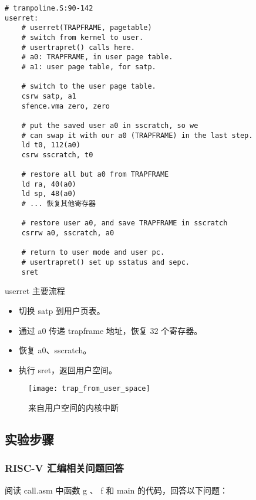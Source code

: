 \begin{listing}[!htb]
	\begin{verbatim}
# trampoline.S:90-142
userret:
    # userret(TRAPFRAME, pagetable)
    # switch from kernel to user.
    # usertrapret() calls here.
    # a0: TRAPFRAME, in user page table.
    # a1: user page table, for satp.

    # switch to the user page table.
    csrw satp, a1
    sfence.vma zero, zero

    # put the saved user a0 in sscratch, so we
    # can swap it with our a0 (TRAPFRAME) in the last step.
    ld t0, 112(a0)
    csrw sscratch, t0

    # restore all but a0 from TRAPFRAME
    ld ra, 40(a0)
    ld sp, 48(a0)
    # ... 恢复其他寄存器

    # restore user a0, and save TRAPFRAME in sscratch
    csrrw a0, sscratch, a0

    # return to user mode and user pc.
    # usertrapret() set up sstatus and sepc.
    sret
	\end{verbatim}
	\caption{userret 主要流程}\label{lst:userret}
\end{listing}

\begin{itemize}
	\item 切换 satp 到用户页表。
	\item 通过 a0 传递 trapframe 地址，恢复 32 个寄存器。
	\item 恢复 a0、sscratch。
	\item 执行 sret，返回用户空间。
\end{itemize}

\begin{figure}[!htb]
	\centering
	\texttt{[image: trap\_from\_user\_space]}
	\caption{来自用户空间的内核中断}
	\label{fig:trap_from_user_space}
\end{figure}

\subsection{实验步骤}

\subsubsection{RISC-V 汇编相关问题回答}

阅读 call.asm 中函数 g 、 f 和 main 的代码，回答以下问题：


